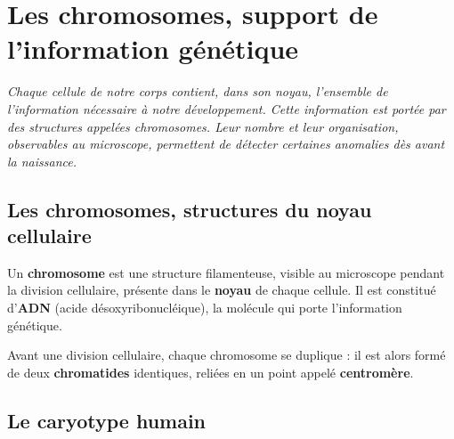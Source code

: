 \chapter{Les chromosomes, support de l'information génétique}

\noindent\textit{Chaque cellule de notre corps contient, dans son noyau, l'ensemble de
l'information nécessaire à notre développement. Cette information est portée par des
structures appelées chromosomes. Leur nombre et leur organisation, observables au
microscope, permettent de détecter certaines anomalies dès avant la naissance.}
\vspace{8pt}

\connecteBanner

\section{Les chromosomes, structures du noyau cellulaire}

\begin{definition}[Chromosome]
Un \textbf{chromosome} est une structure filamenteuse, visible au microscope pendant la
division cellulaire, présente dans le \textbf{noyau} de chaque cellule. Il est constitué
d'\textbf{ADN} (acide désoxyribonucléique), la molécule qui porte l'information
génétique.
\end{definition}

\begin{propriete}
Avant une division cellulaire, chaque chromosome se duplique : il est alors formé de
deux \textbf{chromatides} identiques, reliées en un point appelé
\textbf{centromère}.
\end{propriete}

\begin{illus}
\end{illus}

\section{Le caryotype humain}

